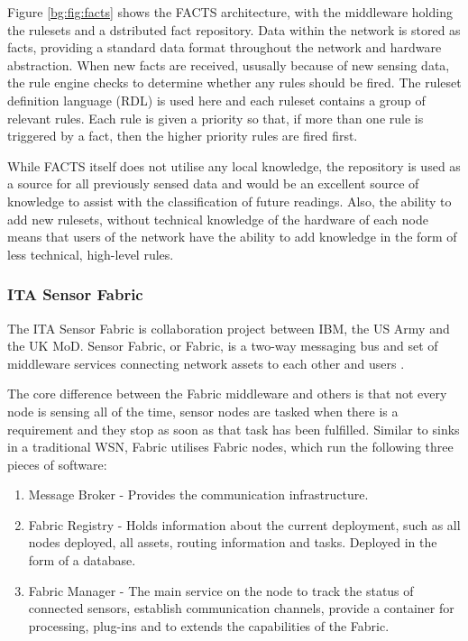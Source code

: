 		Figure \ref{bg:fig:facts} shows the FACTS architecture, with the middleware holding the rulesets and a dstributed fact repository. Data within the network is stored as facts, providing a standard data format throughout the network and hardware abstraction. When new facts are received, ususally because of new sensing data, the rule engine checks to determine whether any rules should be fired. The ruleset definition language (RDL) is used here and each ruleset contains a group of relevant rules. Each rule is given a priority so that, if more than one rule is triggered by a fact, then the higher priority rules are fired first.

		While FACTS itself does not utilise any local knowledge, the repository is used as a source for all previously sensed data and would be an excellent source of knowledge to assist with the classification of future readings. Also, the ability to add new rulesets, without technical knowledge of the hardware of each node means that users of the network have the ability to add knowledge in the form of less technical, high-level rules.
	\subsubsection{ITA Sensor Fabric}
	The ITA Sensor Fabric is collaboration project between IBM, the US Army and the UK MoD. Sensor Fabric, or Fabric, is a two-way messaging bus and set of middleware services connecting network assets to each other and users \cite{Wright2009b}.

The core difference between the Fabric middleware and others is that not every node is sensing all of the time, sensor nodes are tasked when there is a requirement and they stop as soon as that task has been fulfilled. Similar to sinks in a traditional WSN, Fabric utilises Fabric nodes, which run the following three pieces of software:
\begin{enumerate}
	\item Message Broker - Provides the communication infrastructure.
	\item Fabric Registry - Holds information about the current deployment, such as all nodes deployed, all assets, routing information and tasks. Deployed in the form of a database.
	\item Fabric Manager - The main service on the node to track the status of connected sensors, establish communication channels, provide a container for processing, plug-ins and to extends the capabilities of the Fabric.
\end{enumerate}

